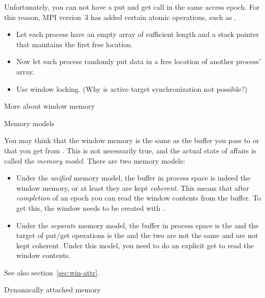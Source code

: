 Unfortunately, you can not have a put and get call in the same access
epoch. For this reason, MPI version~3 has added certain atomic
operations, such as .

\begin{exercise}
  \label{ex:onesidedbuild}
  \begin{itemize}
  \item
    Let each process have an empty array of sufficient length and a
    stack pointer that maintains the first free location.
  \item
    Now let each process randomly put data in a free location of another
    process' array.
  \item Use window locking. (Why is active target synchronization not possible?)
  \end{itemize}
\end{exercise}

 {More about window memory}

 {Memory models}
\label{sec:win-model}

You may think that the window memory is the same as the buffer you
pass to  or that you get from
. This is not necessarily true, and the
actual state of affairs is called the
\emph{memory model}. There are two memory models:
\begin{itemize}
\item Under the \emph{unified} memory
  model, the buffer in process space is indeed the window memory,
  or at least they are kept \emph{coherent}.
  This
  means that after \emph{completion} of an
  epoch you can read the window contents from the buffer.
  To get this, the window needs to be created with
  .
\item Under the \emph{separate} memory
  model, the buffer in process space is the
   and the target of put/get operations
  is the  and the two are not the same
  and are not kept coherent. Under this model, you need to do an
  explicit get to read the window contents.
\end{itemize}
See also section~\ref{sec:win-attr}.

 {Dynamically attached memory}


